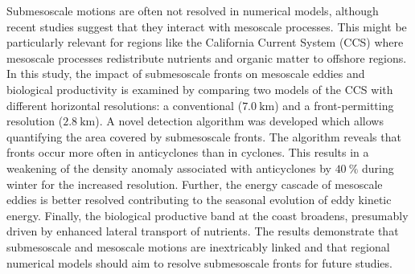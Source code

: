 Submesoscale motions are often not resolved in numerical models, although recent studies suggest that they interact with mesoscale processes. This might be particularly relevant for regions like the California Current System (CCS) where mesoscale processes redistribute nutrients and organic matter to offshore regions. In this study, the impact of submesoscale fronts on mesoscale eddies and biological productivity is examined by comparing two models of the CCS with different horizontal resolutions: a conventional ($\SI{7.0}{\kilo\metre}$) and a front-permitting resolution ($\SI{2.8}{\kilo\metre}$). A novel detection algorithm was developed which allows quantifying the area covered by submesoscale fronts. The algorithm reveals that fronts occur more often in anticyclones than in cyclones. This results in a weakening of the density anomaly associated with anticyclones by $\SI{40}{\percent}$ during winter for the increased resolution. Further, the energy cascade of mesoscale eddies is better resolved contributing to the seasonal evolution of eddy kinetic energy. Finally, the biological productive band at the coast broadens, presumably driven by enhanced lateral transport of nutrients. The results demonstrate that submesoscale and mesoscale motions are inextricably linked and that regional numerical models should aim to resolve submesoscale fronts for future studies.